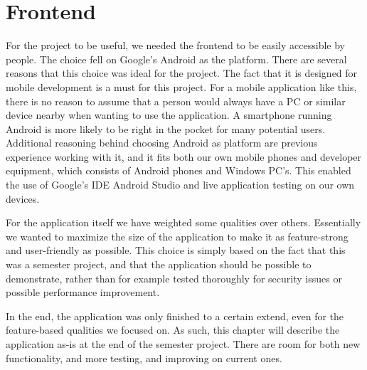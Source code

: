 \chapter{Frontend}
\label{chap:frontend}

For the project to be useful, we needed the frontend to be easily accessible by people. The choice fell on Google's Android as the platform. There are several reasons that this choice was ideal for the project. The fact that it is designed for mobile development is a must for this project. For a mobile application like this, there is no reason to assume that a person would always have a PC or similar device nearby when wanting to use the application. A smartphone running Android is more likely to be right in the pocket for many potential users. Additional reasoning behind choosing Android as platform are previous experience working with it, and it fits both our own mobile phones and developer equipment, which consists of Android phones and Windows PC's. This enabled the use of Google's IDE Android Studio and live application testing on our own devices.

For the application itself we have weighted some qualities over others. Essentially we wanted to maximize the size of the application to make it as feature-strong and user-friendly as possible. This choice is simply based on the fact that this was a semester project, and that the application should be possible to demonstrate, rather than for example tested thoroughly for security issues or possible performance improvement.

In the end, the application was only finished to a certain extend, even for the feature-based qualities we focused on. As such, this chapter will describe the application as-is at the end of the semester project. There are room for both new functionality, and more testing, and improving on current ones.
 



